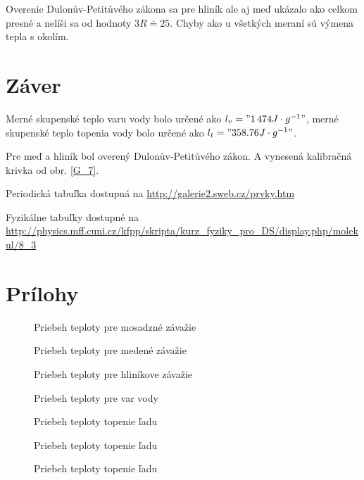 \documentclass[a4paper,10pt]{article}
\begin{document}
Overenie Dulonův-Petitůvého zákona sa pre hliník ale aj meď ukázalo ako celkom presné a nelíši sa od hodnoty $3R \doteq 25 $. 
Chyby ako u všetkých meraní sú výmena tepla s okolím.




\section{Záver}
Merné skupenské teplo varu vody bolo určené ako $l_v = "1\,474 J\cdot g^{-1}"$,
merné skupenské teplo topenia vody bolo určené ako $l_t = "358.76 J\cdot g^{-1}"$.

Pre meď a hliník bol overený Dulonův-Petitůvého zákon. A vynesená kalibračná krivka od obr. \ref{G_7}.



\begin{thebibliography}{2}
Periodická tabuľka dostupná na \url{http://galerie2.sweb.cz/prvky.htm}

Fyzikálne tabuľky dostupné na \url{http://physics.mff.cuni.cz/kfpp/skripta/kurz_fyziky_pro_DS/display.php/molekul/8_3}
\end{thebibliography}

\section{Prílohy}
\begin{figure}

\caption{Priebeh teploty pre mosadzné závažie}  \label{G_1}
\end{figure}

\begin{figure}

\caption{Priebeh teploty pre medené závažie}  \label{G_2}
\end{figure}

\begin{figure}

\caption{Priebeh teploty pre hliníkove závažie}  \label{G_3}
\end{figure}

\begin{figure}

\caption{Priebeh teploty pre var vody}  \label{G_4}
\end{figure}

\begin{figure}

\caption{Priebeh teploty topenie ľadu}  \label{G_5}
\end{figure}

\begin{figure}

\caption{Priebeh teploty topenie ľadu}  \label{G_6}
\end{figure}

\begin{figure}

\caption{Priebeh teploty topenie ľadu}  \label{G_6}
\end{figure}
\end{document}
